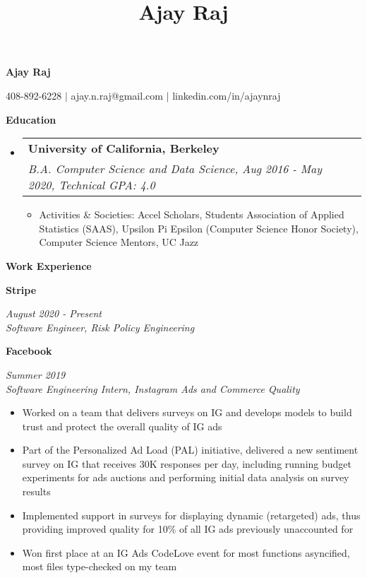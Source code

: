 \documentclass[letterpaper,8pt]{article}
\title{Ajay Raj}
\makeatletter
\newcommand{\resitem}[1]{\item #1 \vspace{-1pt}}
\newcommand{\ressubheading}[4]{
\begin{tabular*}{6.5in}{l@{\extracolsep{\fill}}r}
		\textbf{#1} & #2 \\
		\textit{#3} & \textit{#4} \\
\end{tabular*}\vspace{-6pt}}
\makeatother
\begin{document}
\centerline{\Large{\textbf{Ajay Raj}}}
\centerline{408-892-6228 $\vert$ ajay.n.raj@gmail.com $\vert$ linkedin.com/in/ajaynraj}

\vspace{0.1in}
\textbf{\large{Education}}
\normalsize
{\renewcommand\labelitemi{}
\begin{itemize}
\item
	\ressubheading{University of California, Berkeley}{}{\small{B.A. Computer Science and Data Science, Aug 2016 - May 2020, Technical GPA: 4.0}}{}
	\begin{itemize}[topsep=3pt, noitemsep]
		\resitem{Activities \& Societies: Accel Scholars, Students Association of Applied Statistics (SAAS), Upsilon Pi Epsilon (Computer Science Honor Society), Computer Science Mentors, UC Jazz}
	\end{itemize}

\end{itemize}

\textbf{\large{Work Experience}}
\begin{itemize}[noitemsep]

  \small{\item
      \textbf{\small{Stripe}}}\hfill{\textit{August 2020 - Present}} \\
      \textit{\small{Software Engineer, Risk Policy Engineering}}

  \small{\item
      \textbf{\small{Facebook}}}\hfill{\textit{Summer 2019}} \\
      \textit{\small{Software Engineering Intern, Instagram Ads and Commerce Quality}}
      \begin{itemize}[noitemsep,nolistsep]
		\resitem{\small{Worked on a team that delivers surveys on IG and develops models to build trust and protect the overall quality of IG ads}}
    		\resitem{\small{Part of the Personalized Ad Load (PAL) initiative, delivered a new sentiment survey on IG that receives 30K responses per day, including running budget experiments for ads auctions and performing initial data analysis on survey results}}
		\resitem{\small{Implemented support in surveys for displaying dynamic (retargeted) ads, thus providing improved quality for 10\% of all IG ads previously unaccounted for}}
		\resitem{\small{Won first place at an IG Ads CodeLove event for most functions asyncified, most files type-checked on my team}}
    	\end{itemize}




\end{itemize}}
\end{document}
